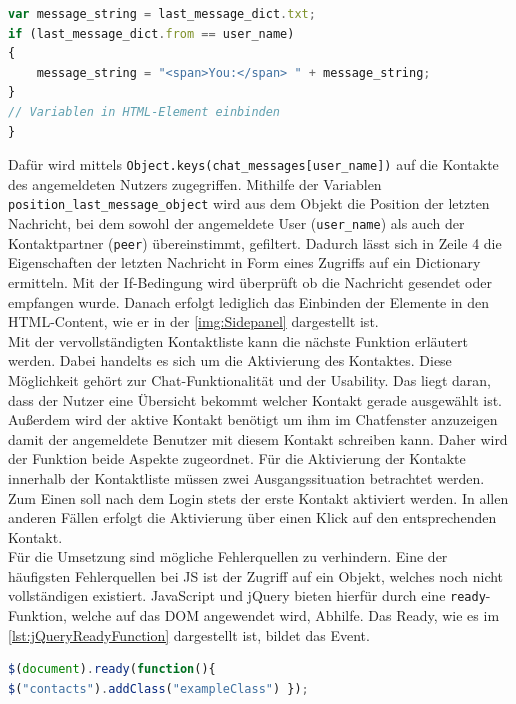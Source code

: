 \documentclass[a4paper,titlepage,halfparskip,12pt]{scrreprt}
\begin{document}
\begin{onehalfspacing}
\begin{lstlisting}[language=Javascript,caption=HTML Elemente für \texttt{fillInContactPeers()},label={lst:HTMLElementsForContaclistfunction}]
var message_string = last_message_dict.txt;
if (last_message_dict.from == user_name)
{
	message_string = "<span>You:</span> " + message_string;
}
// Variablen in HTML-Element einbinden
}
\end{lstlisting}
Dafür wird mittels \texttt{Object.keys(chat\_messages[user\_name])} auf die Kontakte des angemeldeten Nutzers zugegriffen. Mithilfe der Variablen \texttt{position\_last\_message\_object} wird aus dem Objekt die Position der letzten Nachricht, bei dem sowohl der angemeldete User (\texttt{user\_name}) als auch der Kontaktpartner (\texttt{peer}) übereinstimmt, gefiltert. Dadurch lässt sich in Zeile 4 die Eigenschaften der letzten Nachricht in Form eines Zugriffs auf ein Dictionary ermitteln. Mit der If-Bedingung wird überprüft ob die Nachricht gesendet oder empfangen wurde. Danach erfolgt lediglich das Einbinden der Elemente in den \ac{HTML}-Content, wie er in der \autoref{img:Sidepanel} dargestellt ist.\\
Mit der vervollständigten Kontaktliste kann die nächste Funktion erläutert werden. Dabei handelts es sich um die Aktivierung des Kontaktes. Diese Möglichkeit gehört zur Chat-Funktionalität und der Usability. Das liegt daran, dass der Nutzer eine Übersicht bekommt welcher Kontakt gerade ausgewählt ist. Außerdem wird der aktive Kontakt benötigt um ihm im Chatfenster anzuzeigen damit der angemeldete Benutzer mit diesem Kontakt schreiben kann. Daher wird der Funktion beide Aspekte zugeordnet. Für die Aktivierung der Kontakte innerhalb der Kontaktliste müssen zwei Ausgangssituation betrachtet werden. Zum Einen soll nach dem Login stets der erste Kontakt aktiviert werden. In allen anderen Fällen erfolgt die Aktivierung über einen Klick auf den entsprechenden Kontakt.\\
Für die Umsetzung sind mögliche Fehlerquellen zu verhindern. Eine der häufigsten Fehlerquellen bei \ac{JS} ist der Zugriff auf ein Objekt, welches noch nicht vollständigen existiert. JavaScript und jQuery bieten hierfür durch eine \texttt{ready}-Funktion, welche auf das \ac{DOM} angewendet wird, Abhilfe. Das \glqq Ready\grqq, wie es im \autoref{lst:jQueryReadyFunction} dargestellt ist, bildet das Event.

\begin{lstlisting}[language=Javascript,caption= Ready() Funktion von jQuery,label={lst:jQueryReadyFunction}]
$(document).ready(function(){
$("contacts").addClass("exampleClass") });
\end{lstlisting}


\end{onehalfspacing}
\end{document}
